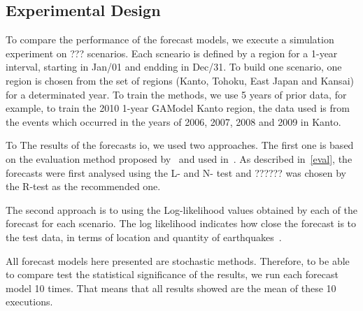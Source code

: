 \subsection{Experimental Design}
To compare the performance of the forecast models, we execute a
simulation experiment on ??? scenarios. Each scneario is defined by a
region for a 1-year interval, starting in Jan/01 and endding in
Dec/31. To build one scenario, one region is chosen from the set of
regions (Kanto, Tohoku, East Japan and Kansai) for a determinated
year. To train the methods, we use 5 years of prior data, for example,
to train the 2010 1-year GAModel Kanto region, the data used is from
the events which occurred in the years of 2006, 2007, 2008 and 2009 in
Kanto.

To The results of the forecasts io, we used two approaches. The first
one is based on the evaluation method proposed
by~\cite{Schorlemmer2007} and used in~\cite{schorlemmer2010first}. As
described in~\ref{eval}, the forecasts were first analysed using the
L- and N- test and ??????  was chosen by the R-test as the recommended
one.

The second approach is to using the Log-likelihood values obtained by
each of the forecast for each scenario. The log likelihood indicates
how close the forecast is to the test data, in terms of location and
quantity of earthquakes~\cite{ecta14}.

All forecast models here presented are stochastic methods. Therefore,
to be able to compare test the statistical significance of the
results, we run each forecast model 10 times. That means that all
results showed are the mean of these 10 executions.

%



